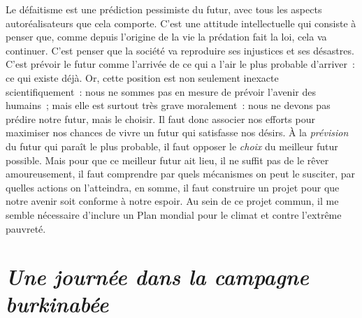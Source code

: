 \documentclass[a5paper,french,openany]{memoir}
\begin{document}
Le défaitisme %
est une prédiction pessimiste du futur, avec tous les aspects autoréalisateurs que cela comporte. C'est une attitude intellectuelle qui consiste à penser que, comme depuis l'origine de la vie la prédation fait la loi, cela va continuer. C'est penser %
que la société va reproduire ses injustices et ses désastres. C'est prévoir le futur comme l'arrivée de ce qui a l'air le plus probable d'arriver~: ce qui existe déjà. Or, cette position est non seulement inexacte scientifiquement~: nous ne sommes pas en mesure de prévoir l'avenir des humains~; mais elle est surtout très grave moralement~: nous ne devons pas prédire notre futur, mais le choisir. %
Il faut donc associer nos efforts pour maximiser nos chances de vivre un futur qui satisfasse nos désirs. À la \textit{prévision} du futur qui paraît le plus probable, il faut opposer le \textit{choix} du meilleur futur possible. Mais pour que ce meilleur futur ait lieu, il ne suffit pas de le rêver amoureusement, il faut comprendre par quels mécanismes on peut le susciter, par quelles actions on l'atteindra, en somme, il faut construire un projet pour que notre avenir soit conforme à notre espoir.
%
Au sein de ce projet commun, il me semble nécessaire d'inclure un Plan mondial pour le climat et contre l'extrême pauvreté. %

\chapter*{\textit{Une journée dans la campagne burkinabée}}\label{ch:narr_burkina}
\end{document}
